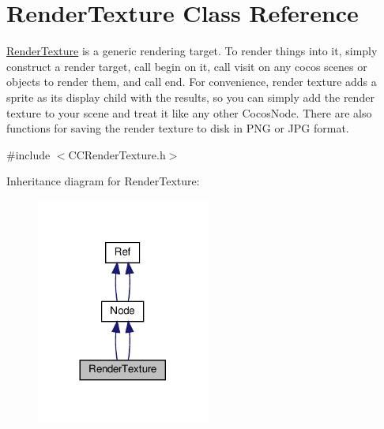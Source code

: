 \hypertarget{classRenderTexture}{}\section{Render\+Texture Class Reference}
\label{classRenderTexture}


\hyperlink{classRenderTexture}{Render\+Texture} is a generic rendering target. To render things into it, simply construct a render target, call begin on it, call visit on any cocos scenes or objects to render them, and call end. For convenience, render texture adds a sprite as it\textquotesingle{}s display child with the results, so you can simply add the render texture to your scene and treat it like any other Cocos\+Node. There are also functions for saving the render texture to disk in P\+NG or J\+PG format.  




{\ttfamily \#include $<$C\+C\+Render\+Texture.\+h$>$}



Inheritance diagram for Render\+Texture\+:
\nopagebreak
\begin{figure}[H]
\begin{center}
\leavevmode
\includegraphics[width=161pt]{classRenderTexture__inherit__graph}
\end{center}
\end{figure}



